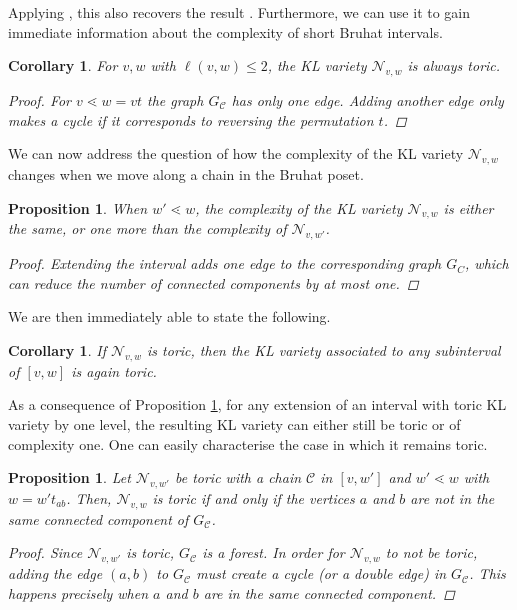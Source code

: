 \documentclass[11pt]{amsart}
\newtheorem{proposition}[theorem]{Proposition}
\newtheorem{corollary}[theorem]{Corollary}
\theoremstyle{definition}
\theoremstyle{definition}
\theoremstyle{definition}
\theoremstyle{definition}
\newcommand{\Nvw}{\mathcal{N}_{v,w}}
\begin{document}
\noindent Applying \cite[Corollary 4.16]{donten2021complexity}, this also recovers the result \cite[Proposition 4.12]{tsukerman2015}. Furthermore,  we can use it to gain immediate information about the complexity of short Bruhat intervals.

\begin{corollary}
    For $v,w$ with $\ell(v,w) \leq 2$, the KL variety $\Nvw$ is always toric.
    \begin{proof}
        For $v \lessdot w = vt$ the graph $G_{\mathcal C}$ has only one edge. Adding another edge only makes a cycle if it corresponds to reversing the permutation $t$.
    \end{proof}
\end{corollary}

\noindent We can now address the question of how the complexity of the KL variety $\Nvw$ changes when we move along a chain in the Bruhat poset. 
 \begin{proposition}\label{prop: complexity change}
    When $w' \lessdot w$, the complexity of the KL variety $\Nvw$ is either the same, or one more than the complexity of $\mathcal N_{v,w'}$. 
    \begin{proof}
        Extending the interval adds one edge to the corresponding graph $G_C$, which can reduce the number of connected components by at most one.
    \end{proof}
\end{proposition}
\noindent We are then immediately able to state the following.
\begin{corollary}\label{cor: KL toric then}
If $\Nvw$ is toric, then the KL variety associated to any subinterval of $[v,w]$ is again toric.

\end{corollary}

\noindent As a consequence of Proposition \ref{prop: complexity change}, for any extension of an interval with toric KL variety by one level, the resulting KL variety can either still be toric or of complexity one. One can easily characterise the case in which it remains toric.

\begin{proposition}\label{prop: extend toric interval}
    Let $\mathcal N_{v,w'}$ be toric with a chain $\mathcal C$ in $[v,w']$ and $w' \lessdot w$ with $w=w't_{ab}$. Then, $\Nvw$ is toric if and only if the vertices $a$ and $b$ are not in the same connected component of $G_{\mathcal C}$.
    \begin{proof}
        Since $\mathcal N_{v,w'}$ is toric, $G_{\mathcal C}$ is a forest. In order for $\Nvw$ to not be toric, adding the edge $(a,b)$ to $G_{\mathcal C}$ must create a cycle (or a double edge) in $G_{\mathcal C}$. This happens precisely when $a$ and $b$ are in the same connected component.
    \end{proof}
\end{proposition}
\end{document}
